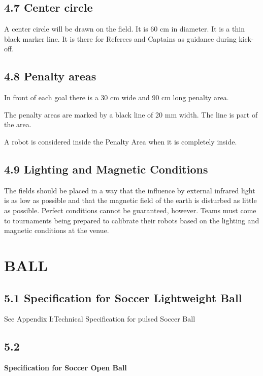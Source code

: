 \documentclass{article}
\begin{document}
\subsection{4.7 Center circle \label{ref-035}}

A center circle will be drawn on the field. It is 60 cm in diameter. It is a thin black marker line. It is there for Referees and Captains as guidance during kick-off. 

\subsection{4.8 Penalty areas \label{ref-036}}

In front of each goal there is a 30 cm wide and 90 cm long penalty area. 

The penalty areas are marked by a black line of 20 mm width. The line is part of the area. 

A robot is considered inside the Penalty Area when it is completely inside. 

\textbf{}

\subsection{4.9 Lighting and Magnetic Conditions \label{ref-037}}

The fields should be placed in a way that the influence by external infrared light is as low as possible and that the magnetic field of the earth is disturbed as little as possible. Perfect conditions cannot be guaranteed, however. Teams must come to tournaments being prepared to calibrate their robots based on the lighting and magnetic conditions at the venue.

\section{BALL \label{ref-038}}

\subsection{\textcolor{color-5}{5.1 Specification for Soccer Lightweight Ball}}

\textcolor{color-5}{See Appendix I:Technical Specification for pulsed Soccer Ball}

\subsection{\textcolor{color-5}{5.2}} \textbf{\textcolor{color-5}{Specification for Soccer Open Ball}}
\end{document}
